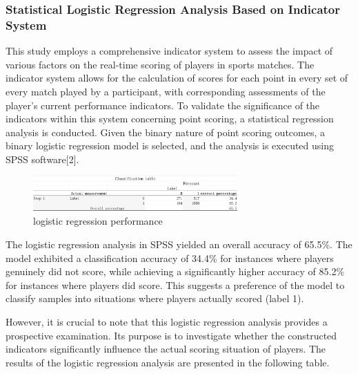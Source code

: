 \documentclass[12pt]{article}
\begin{document}
\subsubsection{Statistical Logistic Regression Analysis Based on Indicator System}
This study employs a comprehensive indicator system to assess the impact of various factors on the real-time scoring of players in sports matches.
The indicator system allows for the calculation of scores for each point in every set of every match played by a participant, with corresponding assessments
of the player's current performance indicators. To validate the significance of the indicators within this system concerning point scoring, a statistical regression analysis is conducted.
Given the binary nature of point scoring outcomes, a binary logistic regression model is selected, and the analysis is executed using SPSS software[2].
\begin{figure}[H]
      \centering
      \includegraphics[width=0.7\textwidth]{logistic_classfication_1.png}
      \caption{logistic regression performance}
\end{figure}
The logistic regression analysis in SPSS yielded an overall accuracy of 65.5\%. The model exhibited a classification accuracy of 34.4\%
for instances where players genuinely did not score, while achieving a significantly higher accuracy of 85.2\% for instances where players did score.
This suggests a preference of the model to classify samples into situations where players actually scored (label 1).

However, it is crucial to note that this logistic regression analysis provides a prospective examination. Its purpose is to investigate
whether the constructed indicators significantly influence the actual scoring situation of players. The results of the logistic regression analysis are presented in the following table.
\end{document}
